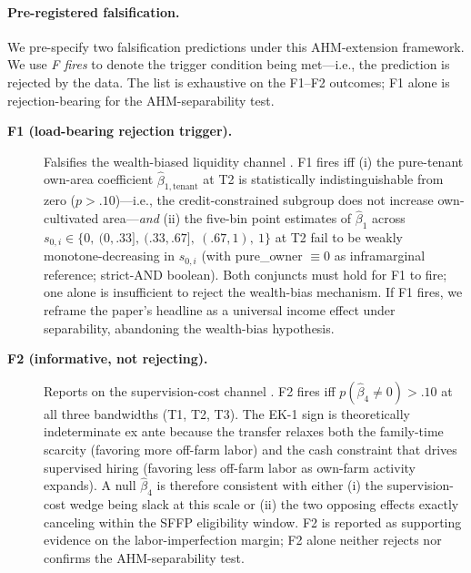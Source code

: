 \documentclass[12pt, a4paper]{article}
\begin{document}
\paragraph{Pre-registered falsification.} We pre-specify two falsification predictions under this AHM-extension framework. We use \emph{F fires} to denote the trigger condition being met---i.e., the prediction is rejected by the data. The list is exhaustive on the F1--F2 outcomes; F1 alone is rejection-bearing for the AHM-separability test.

\begin{description}
\item[\textbf{F1 (load-bearing rejection trigger).}] Falsifies the wealth-biased liquidity channel \citep{CarterOlinto2003_liquidity}. F1 fires iff (i) the pure-tenant own-area coefficient $\hat\beta_{1,\text{tenant}}$ at T2 is statistically indistinguishable from zero ($p > .10$)---i.e., the credit-constrained subgroup does not increase own-cultivated area---\emph{and} (ii) the five-bin point estimates of $\hat\beta_1$ across $s_{0,i} \in \{0,\ (0,.33],\ (.33,.67],\ (.67,1),\ 1\}$ at T2 fail to be weakly monotone-decreasing in $s_{0,i}$ (with pure\_owner $\equiv 0$ as inframarginal reference; strict-AND boolean). Both conjuncts must hold for F1 to fire; one alone is insufficient to reject the wealth-bias mechanism. If F1 fires, we reframe the paper's headline as a universal income effect under separability, abandoning the wealth-bias hypothesis.

\item[\textbf{F2 (informative, not rejecting).}] Reports on the supervision-cost channel \citep{EswaranKotwal1986_supervision}. F2 fires iff $p(\hat\beta_4 \ne 0) > .10$ at all three bandwidths (T1, T2, T3). The EK-1 sign is theoretically indeterminate ex ante because the transfer relaxes both the family-time scarcity (favoring more off-farm labor) and the cash constraint that drives supervised hiring (favoring less off-farm labor as own-farm activity expands). A null $\hat\beta_4$ is therefore consistent with either (i) the supervision-cost wedge being slack at this scale or (ii) the two opposing effects exactly canceling within the SFFP eligibility window. F2 is reported as supporting evidence on the labor-imperfection margin; F2 alone neither rejects nor confirms the AHM-separability test.


\end{description}
\end{document}
